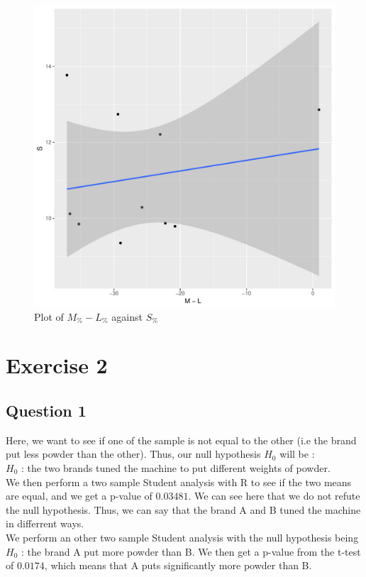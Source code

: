 \documentclass[12pt,a4paper]{article}
\begin{document}
\begin{figure}
  \begin{center}
    \includegraphics[width=0.6\linewidth]{corr2.pdf}
    \caption{Plot of $M_\% - L_\%$ against $S_\%$}
    \label{corr2}
  \end{center}
\end{figure}


\section*{Exercise 2}
\subsection*{Question 1}
Here, we want to see if one of the sample is not equal to the other (i.e the brand put less powder than the other). Thus, our null hypothesis $H_0$ will be :\\
$H_0$ : the two brands tuned the machine to put different weights of powder.\\
We then perform a two sample Student analysis with R to see if the two means are equal, and we get a p-value of $0.03481$. We can see here that we do not refute the null hypothesis. Thus, we can say that the brand A and B tuned the machine in differrent ways.\\
We perform an other two sample Student analysis with the null hypothesis being $H_0$ : the brand A put more powder than B. We then get a p-value from the t-test of $0.0174$, which means that A puts significantly more powder than B.
\end{document}
